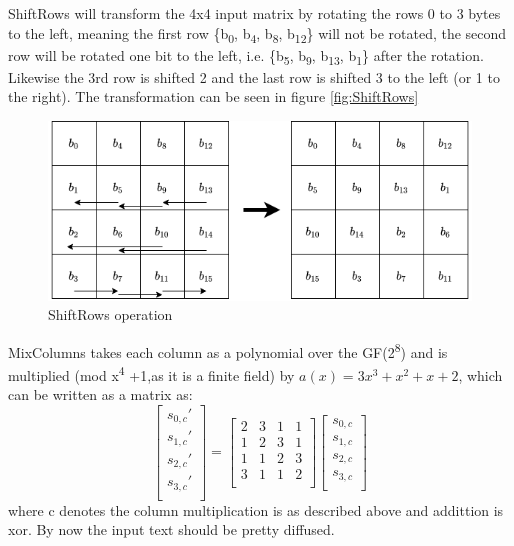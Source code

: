 \documentclass[a4paper]{article}
\begin{document}
ShiftRows will transform the 4x4 input matrix by rotating the rows 0 to 3 bytes to the left, meaning the first row \{b\textsubscript{0}, b\textsubscript{4}, b\textsubscript{8}, b\textsubscript{12}\} will not be rotated, the second row will be rotated one bit to the left, i.e. \{b\textsubscript{5}, b\textsubscript{9}, b\textsubscript{13}, b\textsubscript{1}\} after the rotation. Likewise the 3rd row is shifted 2 and the last row is shifted 3 to the left (or 1 to the right). The transformation can be seen in figure \ref{fig:ShiftRows}


\begin{figure}[htbp]
\centering
\includegraphics[width=.9\linewidth]{./Background/shiftRows.png}
\caption{\label{fig:org2e9b7b0}ShiftRows operation}
\end{figure}

MixColumns takes each column as a polynomial over the GF(2\textsuperscript{8}) and is multiplied (mod x\textsuperscript{4} +1,as it is a finite field) by \(a(x) = 3x^3 + x^2 + x + 2\), which can be written as a matrix as:
\[
\begin{bmatrix}
 s_{0,c}' \\
 s_{1,c}' \\
 s_{2,c}' \\
 s_{3,c}' \\
\end{bmatrix}=
\begin{bmatrix}
 2 & 3 & 1 & 1 \\
 1 & 2 & 3 & 1 \\
 1 & 1 & 2 & 3 \\
 3 & 1 & 1 & 2 \\
\end{bmatrix}
\begin{bmatrix}
 s_{0,c} \\
 s_{1,c} \\
 s_{2,c} \\
 s_{3,c} \\
\end{bmatrix}
\]
where c denotes the column multiplication is as described above and addittion is xor. By now the input text should be pretty diffused.
\end{document}
